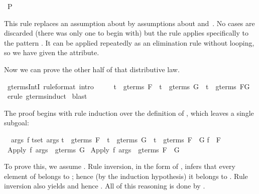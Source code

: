 \begin{isabellebody}
\begin{isamarkuptext}
\begin{isabelle}
{\isasymLongrightarrow}\ P%
\end{isabelle}
This rule replaces an assumption about  by 
assumptions about  and~.  
No cases are discarded (there was only one to begin
with) but the rule applies specifically to the pattern .
It can be applied repeatedly as an elimination rule without looping, so we
have given the  attribute. 

Now we can prove the other half of that distributive law.%
\end{isamarkuptext}%
\isamarkuptrue%
\isamarkupfalse%
\ gterms{\isacharunderscore}IntI\ {\isacharbrackleft}rule{\isacharunderscore}format{\isacharcomma}\ intro{\isacharbang}{\isacharbrackright}{\isacharcolon}\isanewline
\ \ \ \ \ {\isachardoublequoteopen}t\ {\isasymin}\ gterms\ F\ {\isasymLongrightarrow}\ t\ {\isasymin}\ gterms\ G\ {\isasymlongrightarrow}\ t\ {\isasymin}\ gterms\ {\isacharparenleft}F{\isasyminter}G{\isacharparenright}{\isachardoublequoteclose}\isanewline
%
\isadelimproof
%
\endisadelimproof
%
\isatagproof
{}\isamarkupfalse%
\ {\isacharparenleft}erule\ gterms{\isachardot}induct{\isacharparenright}\isanewline
{}\isamarkupfalse%
\ blast\isanewline
{}\isamarkupfalse%
%
\endisatagproof
{\isafoldproof}%
%
\isadelimproof
%
\endisadelimproof
%
\isadelimproof
%
\endisadelimproof
%
\isatagproof
%
\begin{isamarkuptxt}%
The proof begins with rule induction over the definition of
, which leaves a single subgoal:  
\begin{isabelle}%
\ {}{\isachardot}\ {\isasymAnd}args\ f{\isachardot}\isanewline
{}t{\isasymin}set\ args{\isachardot}\isanewline
{}t\ {\isasymin}\ gterms\ F\ {\isasymand}\ {\isacharparenleft}t\ {\isasymin}\ gterms\ G\ {\isasymlongrightarrow}\ t\ {\isasymin}\ gterms\ {\isacharparenleft}F\ {\isasyminter}\ G{\isacharparenright}{\isacharparenright}{\isacharsemicolon}\isanewline
{}f\ {\isasymin}\ F{\isasymrbrakk}\isanewline
{}\ Apply\ f\ args\ {\isasymin}\ gterms\ G\ {\isasymlongrightarrow}\isanewline
{}Apply\ f\ args\ {\isasymin}\ gterms\ {\isacharparenleft}F\ {\isasyminter}\ G{\isacharparenright}%
\end{isabelle}
To prove this, we assume .  Rule inversion,
in the form of , infers
that every element of  belongs to 
; hence (by the induction hypothesis) it belongs
to .  Rule inversion also yields
 and hence . 
All of this reasoning is done by .


\end{isamarkuptxt}
\end{isabellebody}
